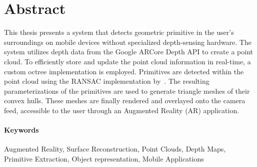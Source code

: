
\section*{Abstract}
%
This thesis presents a system that detects geometric primitive in the user's surroundings on mobile devices without specialized depth-sensing hardware.
The system utilizes depth data from the Google ARCore Depth API to create a point cloud.
To efficiently store and update the point cloud information in real-time, a custom octree implementation is employed.
Primitives are detected within the point cloud using the RANSAC implementation by~\cite{schnabel_efficient_2007}.
The resulting parameterizations of the primitives are used to generate triangle meshes of their convex hulls.
These meshes are finally rendered and overlayed onto the camera feed, accessible to the user through an
Augmented Reality (AR) application.



%


\paragraph*{Keywords}
Augmented Reality, Surface Reconstruction, Point Clouds, Depth Maps, Primitive Extraction, Object representation, Mobile Applications

%
